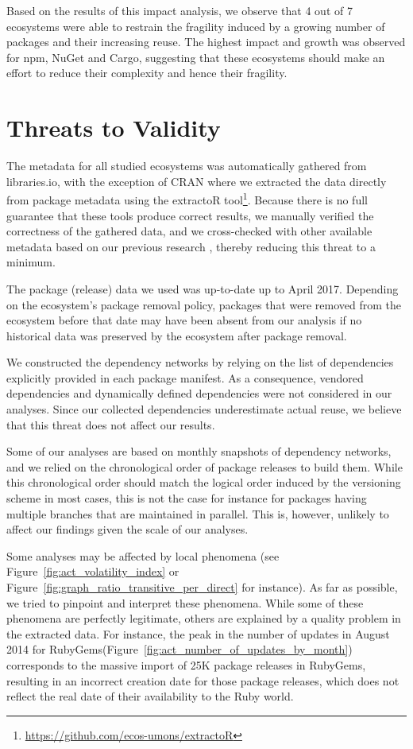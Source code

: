 \documentclass[smallextended]{svjour3}       %
\newcommand{\fig}[1]{Figure~\ref{#1}}
\newcommand{\cran}{\textsf{CRAN}\xspace}
\newcommand{\rubygems}{\textsf{RubyGems}\xspace}
\newcommand{\cargo}{\textsf{Cargo}\xspace}
\newcommand{\nuget}{\textsf{NuGet}\xspace}
\newcommand{\npm}{\textsf{npm}\xspace}
\newcommand{\ruby}{\textsf{Ruby}\xspace}
\begin{document}
Based on the results of this impact analysis, we observe that 4 out of 7 ecosystems were able to restrain the fragility induced by a growing number of packages and their increasing reuse. The highest impact and growth was observed for
\npm, \nuget and \cargo, suggesting that these ecosystems should make an effort to reduce their complexity and hence their fragility.



\section{Threats to Validity}
\label{sec:threats}

The metadata for all studied ecosystems was automatically gathered from \textsf{libraries.io}, with the exception of \cran where we extracted the data directly from package metadata using the \textsf{extractoR} tool\footnote{\url{https://github.com/ecos-umons/extractoR}}. Because there is no full guarantee that these tools produce correct results, we manually verified the correctness of the gathered data, and we cross-checked with other available metadata based on our previous research \cite{Decan2017SANER}, thereby reducing this threat to a minimum.

The package (release) data we used was up-to-date up to April 2017. Depending on the ecosystem's package removal policy, packages that were removed from the ecosystem before that date may have been absent from our analysis if no historical data was preserved by the ecosystem after package removal.

We constructed the dependency networks by relying on the list of dependencies explicitly provided in each package manifest. As a consequence, vendored dependencies and dynamically defined dependencies were not considered in our analyses. 
Since our collected dependencies underestimate actual reuse, we believe that this threat does not affect our results.

Some of our analyses are based on monthly snapshots of dependency networks, and we relied on the chronological order of package releases to build them. While this chronological order should match the logical order induced by the versioning scheme in most cases, this is not the case for instance for packages having multiple branches that are maintained in parallel. This is, however, unlikely to affect our findings given the scale of our analyses. 

Some analyses may be affected by local phenomena (see \fig{fig:act_volatility_index} or \fig{fig:graph_ratio_transitive_per_direct} for instance). As far as possible, we tried to pinpoint and interpret these phenomena. 
While some of these phenomena are perfectly legitimate, others are explained by a quality problem in the extracted data. For instance, the peak in the number of updates in August 2014 for \rubygems (\fig{fig:act_number_of_updates_by_month}) corresponds to the massive import of 25K package releases in \rubygems, resulting in an incorrect creation date for those package releases, which does not reflect the real date of their availability to the \ruby world. 
\end{document}
